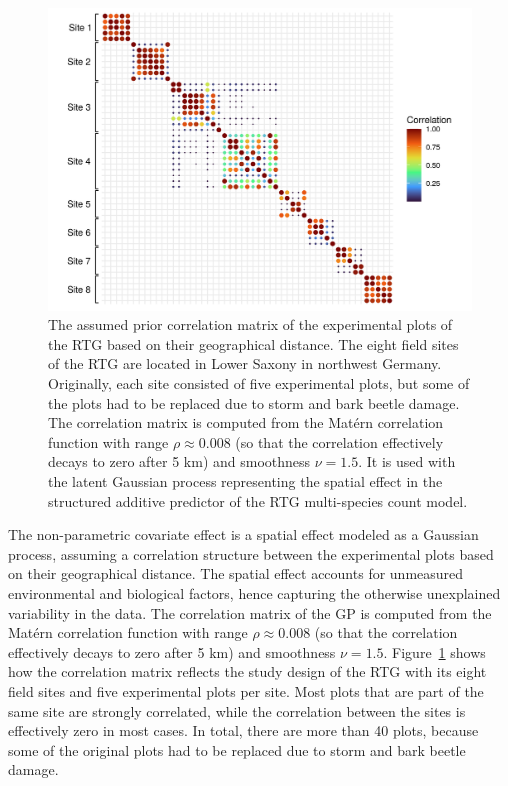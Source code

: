 \documentclass{article}
\begin{document}
\begin{figure}
\centering
\includegraphics[width=.7\linewidth]{figures/rtg-correlation}
\caption{The assumed prior correlation matrix of the experimental plots of the RTG based on their geographical distance. The eight field sites of the RTG are located in Lower Saxony in northwest Germany. Originally, each site consisted of five experimental plots, but some of the plots had to be replaced due to storm and bark beetle damage. The correlation matrix is computed from the Matérn correlation function with range $\rho \approx 0.008$ (so that the correlation effectively decays to zero after 5 km) and smoothness $\nu = 1.5$. It is used with the latent Gaussian process representing the spatial effect in the structured additive predictor of the RTG multi-species count model.}
\label{fig:rtg-correlation}
\end{figure}

The non-parametric covariate effect is a spatial effect modeled as a Gaussian process, assuming a correlation structure between the experimental plots based on their geographical distance. The spatial effect accounts for unmeasured environmental and biological factors, hence capturing the otherwise unexplained variability in the data. The correlation matrix of the GP is computed from the Matérn correlation function with range $\rho \approx 0.008$ (so that the correlation effectively decays to zero after 5 km) and smoothness $\nu = 1.5$. Figure~\ref{fig:rtg-correlation} shows how the correlation matrix reflects the study design of the RTG with its eight field sites and five experimental plots per site. Most plots that are part of the same site are strongly correlated, while the correlation between the sites is effectively zero in most cases. In total, there are more than 40 plots, because some of the original plots had to be replaced due to storm and bark beetle damage.
\end{document}
